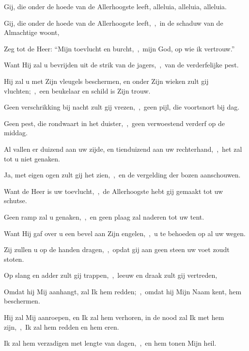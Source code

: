 \documentclass[12pt,twoside,a5paper]{article}
\begin{document}
\begin{halfparskip}
  Gij, die onder de hoede van de Allerhoogste leeft, alleluia, alleluia, alleluia.

  Gij, die onder de hoede van de Allerhoogste leeft,~\sep\ in de schaduw van de Almachtige woont,

  Zeg tot de Heer: ``Mijn toevlucht en burcht,~\sep\ mijn God, op wie ik vertrouw.''

  Want Hij zal u bevrijden uit de strik van de jagers,~\sep\ van de verderfelijke pest.

  Hij zal u met Zijn vleugels beschermen, en onder Zijn wieken zult gij vluchten;~\sep\ een beukelaar en schild is Zijn trouw.

  Geen verschrikking bij nacht zult gij vrezen,~\sep\ geen pijl, die voortsnort bij dag.

  Geen pest, die rondwaart in het duister,~\sep\ geen verwoestend verderf op de middag.

  Al vallen er duizend aan uw zijde, en tienduizend aan uw rechterhand,~\sep\ het zal tot u niet genaken.

  Ja, met eigen ogen zult gij het zien,~\sep\ en de vergelding der bozen aanschouwen.

  Want de Heer is uw toevlucht,~\sep\ de Allerhoogste hebt gij gemaakt tot uw schutse.

  Geen ramp zal u genaken,~\sep\ en geen plaag zal naderen tot uw tent.

  Want Hij gaf over u een bevel aan Zijn engelen,~\sep\ u te behoeden op al uw wegen.

  Zij zullen u op de handen dragen,~\sep\ opdat gij aan geen steen uw voet zoudt stoten.

  Op slang en adder zult gij trappen,~\sep\ leeuw en draak zult gij vertreden,

  Omdat hij Mij aanhangt, zal Ik hem redden;~\sep\ omdat hij Mijn Naam kent, hem beschermen.

  Hij zal Mij aanroepen, en Ik zal hem verhoren, in de nood zal Ik met hem zijn,~\sep\ Ik zal hem redden en hem eren.

  Ik zal hem verzadigen met lengte van dagen,~\sep\ en hem tonen Mijn heil.
\end{halfparskip}

\end{document}
